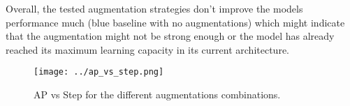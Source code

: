 \documentclass[
    headings=optiontohead,              %
    12pt,                               %
    DIV=13,                             %
    twoside=false,                      %
    open=right,                         %
    BCOR=00mm,                          %
    toc=bibliographynumbered,            %
    parskip=half,                       %
]{scrarticle}
\begin{document}
    Overall, the tested augmentation strategies don't improve the models performance much (blue baseline with no augmentations) which might indicate that the augmentation might not be strong enough or the model has already reached its maximum learning capacity in its current architecture.

    \begin{figure}[htpb]
        \centering
        \texttt{[image: ../ap\_vs\_step.png]}
        \caption{AP vs Step for the different augmentations combinations.}
        \label{fig:7.2}
    \end{figure}


    
\end{document}
